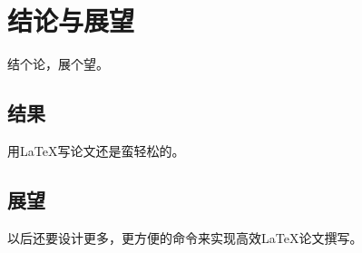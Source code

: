 
\chapter{结论与展望}

结个论，展个望。

\section{结果}
用\LaTeX 写论文还是蛮轻松的。

\section{展望}
以后还要设计更多，更方便的命令来实现高效\LaTeX 论文撰写。



